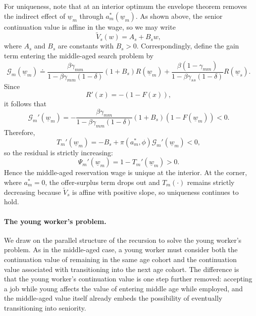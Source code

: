 \documentclass{article}
\newcommand{\lbar}[1]{\underline{#1}} %
\begin{document}
For uniqueness, note that at an interior optimum the envelope theorem removes the indirect effect of $\lbar w_m$ through $a_m^*(\lbar w_m)$. As shown above, the senior continuation value is affine in the wage, so we may write
\[
\tilde V_s(w)=A_s+B_sw,
\]
where $A_s$ and $B_s$ are constants with $B_s>0$. Correspondingly, define the gain term entering the middle-aged search problem by
\[
\mathcal G_m(\lbar w_m)
\doteq
\frac{\beta\gamma_{mm}}{1-\beta\gamma_{mm}(1-\delta)}
(1+B_s)R(\lbar w_m)
+
\frac{\beta(1-\gamma_{mm})}{1-\beta\gamma_{ss}(1-\delta)}R(\lbar w_s).
\]
Since
\[
R'(x)=-(1-F(x)),
\]
it follows that
\[
\mathcal G_m'(\lbar w_m)
=
-\frac{\beta\gamma_{mm}}{1-\beta\gamma_{mm}(1-\delta)}
(1+B_s)(1-F(\lbar w_m))
<0.
\]
Therefore,
\[
T_m'(\lbar w_m)
=
-B_s+\pi(a_m^*,\phi)\mathcal G_m'(\lbar w_m)
<0,
\]
so the residual is strictly increasing:
\[
\Psi_m'(\lbar w_m)=1-T_m'(\lbar w_m)>0.
\]
Hence the middle-aged reservation wage is unique at the interior. At the corner, where $a_m^*=0$, the offer-surplus term drops out and $T_m(\cdot)$ remains strictly decreasing because $\tilde V_s$ is affine with positive slope, so uniqueness continues to hold.


\paragraph{The young worker's problem.}
We draw on the parallel structure of the recursion to solve the young worker's problem. As in the middle-aged case, a young worker must consider both the continuation value of remaining in the same age cohort and the continuation value associated with transitioning into the next age cohort. The difference is that the young worker's continuation value is one step further removed: accepting a job while young affects the value of entering middle age while employed, and the middle-aged value itself already embeds the possibility of eventually transitioning into seniority.
\end{document}
